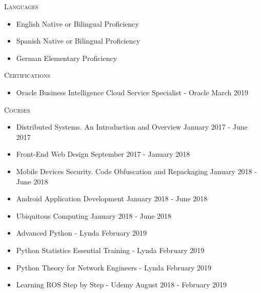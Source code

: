 \documentclass[11pt]{article}
\let\oldbibentry\bibentry
\renewcommand{\bibentry}[1]{\oldbibentry{#1}.}
\renewcommand{\section}[1]
{\vspace{1.0\baselineskip}{\Large\textbf{#1}}}
\begin{document}



\section{Skills}

\textsc{Languages}
\begin{itemize}
    \item[] English \hfill Native or Bilingual Proficiency
    \item[] Spanish \hfill Native or Bilingual Proficiency
    \item[] German \hfill Elementary Proficiency
\end{itemize}

\textsc{Certifications}
\begin{itemize}
    \item[] Oracle Business Intelligence Cloud Service Specialist - Oracle \hfill March 2019
\end{itemize}

\textsc{Courses}
\begin{itemize}
    \item[] Distributed Systems. An Introduction and Overview \hfill January 2017 - June 2017
    \item[] Front-End Web Design \hfill September 2017 - January 2018
    \item[] Mobile Devices Security. Code Obfuscation and Repackaging \hfill January 2018 - June 2018
    \item[] Android Application Development \hfill January 2018 - June 2018
    \item[] Ubiquitous Computing \hfill January 2018 - June 2018
    \item[] Advanced Python - Lynda \hfill February 2019
    \item[] Python Statistics Essential Training - Lynda \hfill February 2019
    \item[] Python Theory for Network Engineers - Lynda \hfill February 2019
    \item[] Learning ROS Step by Step - Udemy \hfill August 2018 - February 2019
\end{itemize}
\end{document}
